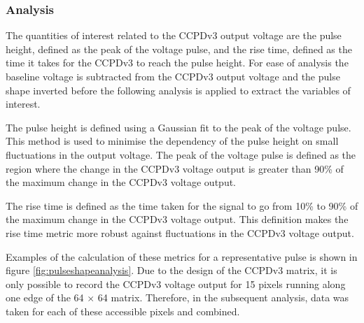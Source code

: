 
\subsubsection{Analysis}
The quantities of interest related to the CCPDv3 output voltage are the pulse height, defined as the peak of the voltage pulse, and the rise time, defined as the time it takes for the CCPDv3 to reach the pulse height.  For ease of analysis the baseline voltage is subtracted from the CCPDv3 output voltage and the pulse shape inverted before the following analysis is applied to extract the variables of interest.  

The pulse height is defined using a Gaussian fit to the peak of the voltage pulse.  This method is used to minimise the dependency of the pulse height on small fluctuations in the output voltage.  The peak of the voltage pulse is defined as the region where the change in the CCPDv3 voltage output is greater than 90\% of the maximum change in the CCPDv3 voltage output.  

The rise time is defined as the time taken for the signal to go from 10\% to 90\% of the maximum change in the CCPDv3 voltage output.  This definition makes the rise time metric more robust against fluctuations in the CCPDv3 voltage output.  

Examples of the calculation of these metrics for a representative pulse is shown in figure \ref{fig:pulseshapeanalysis}.  Due to the design of the CCPDv3 matrix, it is only possible to record the CCPDv3 voltage output for 15 pixels running along one edge of the 64 $\times$ 64 matrix.  Therefore, in the subsequent analysis, data was taken for each of these accessible pixels and combined.

